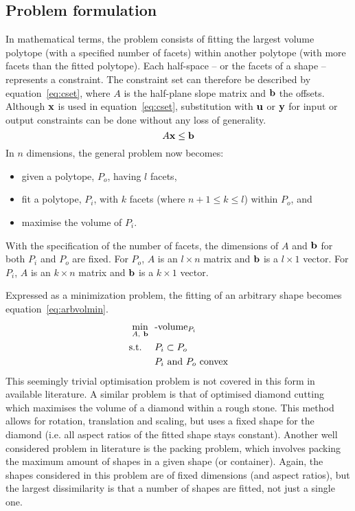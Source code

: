 \subsection{Problem formulation}
In mathematical terms, the problem consists of fitting the largest volume polytope (with a specified number of facets) within another polytope (with more facets than the fitted polytope).
Each half-space -- or the facets of a shape -- represents a constraint.
The constraint set can therefore be described by equation~\ref{eq:cset}, where $A$ is the half-plane slope matrix and ${\bf {b}}$ the offsets.
Although ${\bf {x}}$ is used in equation~\ref{eq:cset}, substitution with ${\bf {u}}$ or ${\bf {y}}$ for input or output constraints can be done without any loss of generality.
\begin{equation}
  \label{eq:cset}
  A{\bf {x}} \leq {\bf {b}}
\end{equation}
In $n$ dimensions, the general problem now becomes: 
\begin{itemize}
  \item given a polytope, $P_o$, having $l$ facets,
  \item fit a polytope, $P_i$, with $k$ facets (where $n+1 \leq k \le l$) within $P_o$, and
  \item maximise the volume of $P_i$.
\end{itemize} 
With the specification of the number of facets, the dimensions of $A$ and ${\bf {b}}$ for both $P_i$ and $P_o$ are fixed.
For $P_o$, $A$ is an $l \times n$ matrix and ${\bf {b}}$ is a $l \times 1$ vector.
For $P_i$, $A$ is an $k \times n$ matrix and ${\bf {b}}$ is a $k \times 1$ vector.

Expressed as a minimization problem, the fitting of an arbitrary shape  becomes equation~\ref{eq:arbvolmin}.
\begin{align}
  \label{eq:arbvolmin}
    \min_{A,~{\bf {b}}}~~&\text{-volume}_{P_i}\\
    \text{s.t.}~~~~ &P_i \subset P_o \notag \\
                    &P_i \text{~and~} P_o \text{~convex} \notag
\end{align}
This seemingly trivial optimisation problem is not covered in this form in available literature.
A similar problem is that of optimised diamond cutting \citep{diamondcut} which maximises the volume of a diamond within a rough stone.
This method allows for rotation, translation and scaling, but uses a fixed shape for the diamond (i.e. all aspect ratios of the fitted shape stays constant).
Another well considered problem in literature is the packing problem, which involves packing the maximum amount of shapes in a given shape (or container).
Again, the shapes considered in this problem are of fixed dimensions (and aspect ratios), but the largest dissimilarity is that a number of shapes are fitted, not just a single one.

